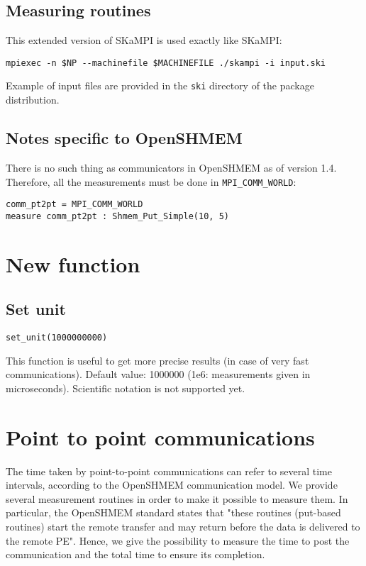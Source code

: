 \documentclass[12pt, letterpaper]{article}
\begin{document}
\subsection{Measuring routines}

This extended version of SKaMPI is used exactly like SKaMPI:
\begin{lstlisting}
mpiexec -n $NP --machinefile $MACHINEFILE ./skampi -i input.ski
\end{lstlisting}

Example of input files are provided in the {\tt ski} directory of the package distribution.

\subsection{Notes specific to OpenSHMEM}

There is no such thing as communicators in OpenSHMEM as of version 1.4. Therefore, all the measurements must be done in {\tt MPI\_COMM\_WORLD}:

\begin{lstlisting}
comm_pt2pt = MPI_COMM_WORLD
measure comm_pt2pt : Shmem_Put_Simple(10, 5)
\end{lstlisting}

\section{New function}

\subsection{Set unit}

\begin{lstlisting}
set_unit(1000000000)
\end{lstlisting}

This function is useful to get more precise results (in case of very fast communications). Default value: 1000000 (1e6: measurements given in microseconds). Scientific notation is not supported yet.

\section{Point to point communications}

The time taken by point-to-point communications can refer to several time intervals, according to the OpenSHMEM communication model. We provide several measurement routines in order to make it possible to measure them. In particular, the OpenSHMEM standard states that "these routines (put-based routines) start the remote transfer and may return before the data is delivered to the remote PE". Hence, we give the possibility to measure the time to post the communication and the total time to ensure its completion.
\end{document}

